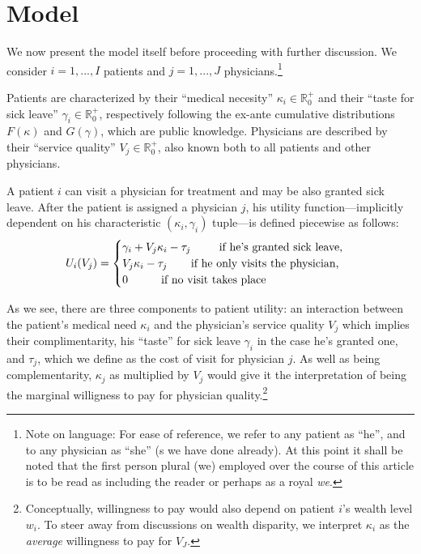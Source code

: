 \documentclass[../main.tex]{subfiles}
\begin{document}
\section{Model}

We now present the model itself before proceeding with further discussion. We consider $i = 1, ..., I$ patients and $j = 1, ..., J$ physicians.\footnote{Note on language: For ease of reference, we refer to any patient as ``he'', and to any physician as ``she'' (s we have done already). At this point it shall be noted that the first person plural (we) employed over the course of this article is to be read as including the reader or perhaps as a royal \textit{we}.}

Patients are characterized by their ``medical necesity'' $\kappa_i \in \mathbb{R}_0^+$ and their ``taste for sick leave'' $\gamma_i \in \mathbb{R}_0^+$, respectively following the ex-ante cumulative distributions $F(\kappa)$ and $G(\gamma)$, which are public knowledge. Physicians are described by their ``service quality'' $V_j \in \mathbb{R}_0^+$, also known both to all patients and other physicians.

A patient $i$ can visit a physician for treatment and may be also granted sick leave. After the patient is assigned a physician $j$, his utility function—implicitly dependent on his characteristic $(\kappa_i,\gamma_i)$ tuple—is defined piecewise as follows:
    \[
U_i(V_j) =\begin{cases}
\gamma_i + V_j \kappa_i - \tau_j \text{  \hspace{0.65cm} if he’s granted sick leave,} \\
V_j \kappa_i - \tau_j \text{  \hspace{0.5cm} if he only visits the physician,} \\
0 \text{  \hspace{0.8cm} if no visit takes place}
\end{cases}
\]

As we see, there are three components to patient utility: an interaction between the patient's medical need $\kappa_i$ and the physician's service quality $V_j$ which implies their complimentarity, his ``taste'' for sick leave $\gamma_i$ in the case he's granted one, and $\tau_j$, which we define as the cost of visit for physician $j$. As well as being complementarity, $\kappa_j$ as multiplied by $V_j$ would give it the interpretation of being the marginal willigness to pay for physician quality.\footnote{Conceptually, willingness to pay would also depend on patient $i$'s wealth level $w_i$. To steer away from discussions on wealth disparity, we interpret $\kappa_i$ as the \textit{average} willingness to pay for $V_J$.}
\end{document}
